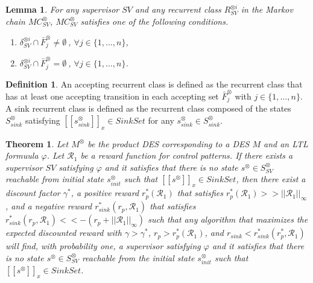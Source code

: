 \documentclass[10pt]{article}
\newtheorem{theorem}{Theorem}
\newtheorem{lemma}{Lemma}
\theoremstyle{definition}
\newtheorem{definition}{Definition}
\newcommand{\myspq}{\ensuremath{[\![s^{\otimes}]\!]}_x}
\newcommand{\myspqsink}{\ensuremath{[\![s^{\otimes}_{sink}]\!]}_x}
\begin{document}
\begin{lemma}
  For any supervisor $SV$ and any recurrent class $R^{\otimes i}_{SV}$ in the Markov chain $MC^{\otimes}_{SV}$,
  $MC^{\otimes}_{SV}$ satisfies one of the following conditions.
  \vspace{2mm}
  \begin{enumerate}
    \item $\delta^{\otimes i}_{SV} \cap \bar{F}^{\otimes}_j \neq \emptyset\ $, $ \forall j \in \{ 1, \ldots ,n \}$,
    \item $\delta^{\otimes i}_{SV} \cap \bar{F}^{\otimes}_j = \emptyset\ $, $ \forall j \in \{ 1, \ldots ,n \}$.
  \end{enumerate}
  \label{lemma3-1}
\end{lemma}

\begin{definition}
  An accepting recurrent class is defined as the recurrent class that has at least one accepting transition in each accepting set $\bar{F}^{\otimes}_j$ with $j \in \{ 1, \ldots, n \}$. A sink recurrent class is defined as the recurrent class composed of the states $S^{\otimes}_{sink}$ satisfying $\myspqsink \in SinkSet$ for any $s^{\otimes}_{sink} \in S^{\otimes}_{sink}$.
\end{definition}

\begin{theorem}
  Let $M^{\otimes}$ be the product DES corresponding to a DES $M$ and an LTL formuula $\varphi$. Let $\mathcal{R}_1$ be a reward function for control patterns. %
  If there exists a supervisor $SV$ satisfying $\varphi$ and it satisfies that there is no state $s^{\otimes} \in S^{\otimes}_{SV}$ reachable from initial state $s^{\otimes}_{init}$ such that $\myspq \in SinkSet$, then there exist a discount factor $\gamma^{\ast}$, a positive reward $r^{\ast}_p(\mathcal{R}_1)$ that satisfies $ r^{\ast}_p(\mathcal{R}_1) >> ||\mathcal{R}_1||_{\infty}$, and a negative reward $r^{\ast}_{sink}(r_p, \mathcal{R}_1)$ that satisfies $r^{\ast}_{sink}(r_p, \mathcal{R}_1) << - (r_p + ||\mathcal{R}_1||_{\infty}) $ such that any algorithm that maximizes the expected discounted reward with $\gamma > \gamma^{\ast}$, $r_p > r^{\ast}_p(\mathcal{R}_1)$, and $r_{sink} < r^{\ast}_{sink}(r^{\ast}_p, \mathcal{R}_1)$ will find, with probability one, a supervisor satisfying $\varphi$ and it satisfies that there is no state $s^{\otimes} \in S^{\otimes}_{SV}$ reachable from the initial state $s^{\otimes}_{init}$ such that $\myspq \in SinkSet$.
\end{theorem}
\end{document}
